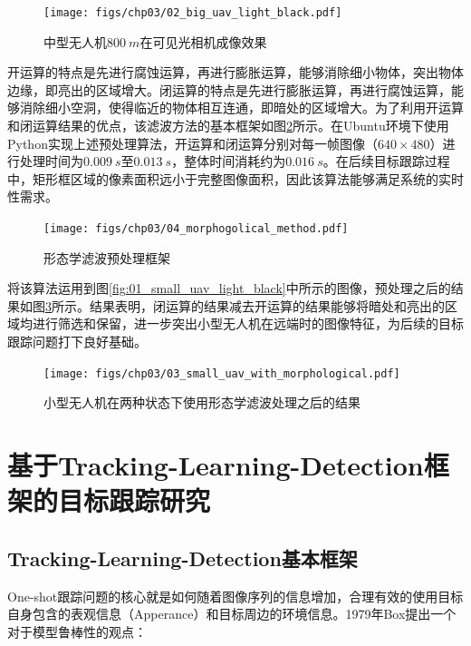 \begin{figure}[ht]   
	\centering
	\texttt{[image: figs/chp03/02\_big\_uav\_light\_black.pdf]}
	\caption{中型无人机$800\ m$在可见光相机成像效果}
	\label{fig:02_big_uav_light_black}
\end{figure}

开运算的特点是先进行腐蚀运算，再进行膨胀运算，能够消除细小物体，突出物体边缘，即亮出的区域增大。闭运算的特点是先进行膨胀运算，再进行腐蚀运算，能够消除细小空洞，使得临近的物体相互连通，即暗处的区域增大。为了利用开运算和闭运算结果的优点，该滤波方法的基本框架如图\ref{fig:04_morphogolical_method}所示。在Ubuntu环境下使用Python实现上述预处理算法，开运算和闭运算分别对每一帧图像（$640 \times 480$）进行处理时间为$0.009\ s$至$0.013\ s$，整体时间消耗约为$0.016\ s$。在后续目标跟踪过程中，矩形框区域的像素面积远小于完整图像面积，因此该算法能够满足系统的实时性需求。

\begin{figure}[ht]   
	\centering
	\texttt{[image: figs/chp03/04\_morphogolical\_method.pdf]}
	\caption{形态学滤波预处理框架}
	\label{fig:04_morphogolical_method}
\end{figure}

将该算法运用到图\ref{fig:01_small_uav_light_black}中所示的图像，预处理之后的结果如图\ref{fig:03_small_uav_with_morphological}所示。结果表明，闭运算的结果减去开运算的结果能够将暗处和亮出的区域均进行筛选和保留，进一步突出小型无人机在远端时的图像特征，为后续的目标跟踪问题打下良好基础。

\begin{figure}[ht]   
	\centering
	\texttt{[image: figs/chp03/03\_small\_uav\_with\_morphological.pdf]}
	\caption{小型无人机在两种状态下使用形态学滤波处理之后的结果}
	\label{fig:03_small_uav_with_morphological}
\end{figure}




\section{基于Tracking-Learning-Detection框架的目标跟踪研究}
\subsection{Tracking-Learning-Detection基本框架}
One-shot跟踪问题的核心就是如何随着图像序列的信息增加，合理有效的使用目标自身包含的表观信息（Apperance）和目标周边的环境信息。1979年Box提出一个对于模型鲁棒性的观点\cite{box1979robustness}：

